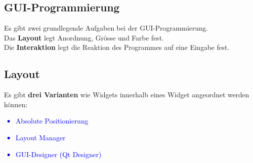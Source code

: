 \subsection{GUI-Programmierung}
Es gibt zwei grundlegende Aufgaben bei der GUI-Programmierung.\\
Das \textbf{Layout} legt Anordnung, Grösse  und Farbe fest.\\
Die \textbf{Interaktion} legt die Reaktion des Programmes auf eine Eingabe fest. \\

\subsection{Layout}
Es gibt \textbf{drei Varianten} wie Widgets innerhalb eines Widget angeordnet werden können: \newline
\textcolor{blue}{
    \begin{itemize}
        \item Absolute Positionierung
        \item Layout Manager
        \item GUI-Designer (Qt Designer)
    \end{itemize}
}

